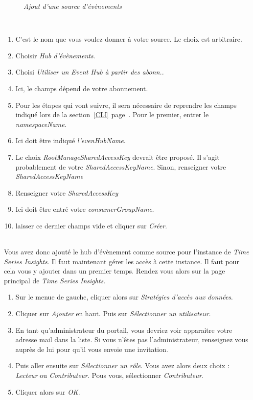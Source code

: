\begin{enumerate}
\begin{figure}[H]
\begin{center}
\end{center}
	\caption{ \textit{Ajout d'une source d'évènements}}
\end{figure}\\
	\begin{enumerate}
	\item C'est le nom que vous voulez donner à votre source. Le choix est arbitraire.
	\item Choisir \textit{Hub d'évènements}.
	\item Choisi \textit{Utiliser un Event Hub à partir des abonn..}
	\item Ici, le champs dépend de votre abonnement.
	\item Pour les étapes qui vont suivre, il sera nécessaire de reprendre les champs indiqué lors de la section~\ref{CLI} page~\pageref{CLI}. Pour le premier, entrer le \textit{namespaceName}.
	\item Ici doit être indiqué \textit{l'evenHubName}.
	\item Le choix \textit{RootManageSharedAccessKey} devrait être proposé. Il s'agit probablement de votre \textit{SharedAccessKeyName}. Sinon, renseigner votre \textit{SharedAccessKeyName}
	\item Renseigner votre \textit{SharedAccessKey}
	\item Ici doit être entré votre \textit{consumerGroupName}.
	\item laisser ce dernier champs vide et cliquer sur \textit{Créer}.
	\end{enumerate}
\end{enumerate}\\

Vous avez donc ajouté le hub d'évènement comme source pour l'instance de \textit{Time Series Insights}. Il faut maintenant gérer les accès à cette instance. Il faut pour cela vous y ajouter dans un premier temps. Rendez vous alors sur la page principal de \textit{Time Series Insights}.\\

\begin{enumerate}
\item Sur le menue de gauche, cliquer alors sur \textit{Stratégies d'accès aux données}.
\item Cliquer sur \textit{Ajouter} en haut. Puis sur  \textit{Sélectionner un utilisateur}.
\item En tant qu'administrateur du portail, vous devriez voir apparaitre votre adresse mail dans la liste. Si vous n'êtes pas l'administrateur, renseignez vous auprès de lui pour qu'il vous envoie une invitation.
\item Puis aller ensuite sur \textit{Sélectionner un rôle}. Vous avez alors deux choix : \textit{Lecteur} ou \textit{Contributeur}. Pous vous, sélectionner \textit{Contributeur}.
\item Cliquer alors sur \textit{OK}.
\end{enumerate}\\



